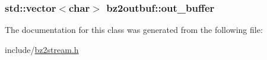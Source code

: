 \subsubsection[{out\+\_\+buffer}]{\setlength{\rightskip}{0pt plus 5cm}std\+::vector$<$char$>$ bz2outbuf\+::out\+\_\+buffer\hspace{0.3cm}{\ttfamily [protected]}}\label{classbz2outbuf_a8634b0224b7912495b80d02963573c65}


The documentation for this class was generated from the following file\+:\begin{DoxyCompactItemize}
\item 
include/\hyperlink{bz2stream_8h}{bz2stream.\+h}\end{DoxyCompactItemize}
